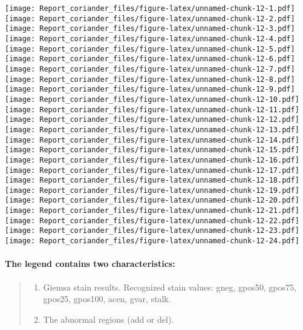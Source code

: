 \documentclass[]{article}
\providecommand{\tightlist}{%
  \setlength{\itemsep}{0pt}\setlength{\parskip}{0pt}}
\let\oldparagraph\paragraph
\renewcommand{\paragraph}[1]{\oldparagraph{#1}\mbox{}}
\begin{document}
\texttt{[image: Report\_coriander\_files/figure-latex/unnamed-chunk-12-1.pdf]}
\texttt{[image: Report\_coriander\_files/figure-latex/unnamed-chunk-12-2.pdf]}
\texttt{[image: Report\_coriander\_files/figure-latex/unnamed-chunk-12-3.pdf]}
\texttt{[image: Report\_coriander\_files/figure-latex/unnamed-chunk-12-4.pdf]}
\texttt{[image: Report\_coriander\_files/figure-latex/unnamed-chunk-12-5.pdf]}
\texttt{[image: Report\_coriander\_files/figure-latex/unnamed-chunk-12-6.pdf]}
\texttt{[image: Report\_coriander\_files/figure-latex/unnamed-chunk-12-7.pdf]}
\texttt{[image: Report\_coriander\_files/figure-latex/unnamed-chunk-12-8.pdf]}
\texttt{[image: Report\_coriander\_files/figure-latex/unnamed-chunk-12-9.pdf]}
\texttt{[image: Report\_coriander\_files/figure-latex/unnamed-chunk-12-10.pdf]}
\texttt{[image: Report\_coriander\_files/figure-latex/unnamed-chunk-12-11.pdf]}
\texttt{[image: Report\_coriander\_files/figure-latex/unnamed-chunk-12-12.pdf]}
\texttt{[image: Report\_coriander\_files/figure-latex/unnamed-chunk-12-13.pdf]}
\texttt{[image: Report\_coriander\_files/figure-latex/unnamed-chunk-12-14.pdf]}
\texttt{[image: Report\_coriander\_files/figure-latex/unnamed-chunk-12-15.pdf]}
\texttt{[image: Report\_coriander\_files/figure-latex/unnamed-chunk-12-16.pdf]}
\texttt{[image: Report\_coriander\_files/figure-latex/unnamed-chunk-12-17.pdf]}
\texttt{[image: Report\_coriander\_files/figure-latex/unnamed-chunk-12-18.pdf]}
\texttt{[image: Report\_coriander\_files/figure-latex/unnamed-chunk-12-19.pdf]}
\texttt{[image: Report\_coriander\_files/figure-latex/unnamed-chunk-12-20.pdf]}
\texttt{[image: Report\_coriander\_files/figure-latex/unnamed-chunk-12-21.pdf]}
\texttt{[image: Report\_coriander\_files/figure-latex/unnamed-chunk-12-22.pdf]}
\texttt{[image: Report\_coriander\_files/figure-latex/unnamed-chunk-12-23.pdf]}
\texttt{[image: Report\_coriander\_files/figure-latex/unnamed-chunk-12-24.pdf]}

\hypertarget{the-legend-contains-two-characteristics}{%
\paragraph{The legend contains two
characteristics:}\label{the-legend-contains-two-characteristics}}

\begin{quote}
\begin{enumerate}
\def\labelenumi{\arabic{enumi}.}
\tightlist
\item
  Giemsa stain results. Recognized stain values: gneg, gpos50, gpos75,
  gpos25, gpos100, acen, gvar, stalk.
\item
  The abnormal regions (add or del).
\end{enumerate}
\end{quote}
\end{document}
